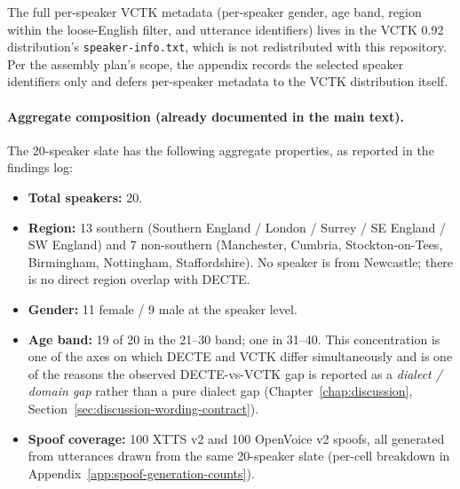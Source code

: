 The full per-speaker VCTK metadata (per-speaker gender, age band,
region within the loose-English filter, and utterance identifiers)
lives in the VCTK 0.92 distribution's \texttt{speaker-info.txt}, which
is not redistributed with this repository. Per the assembly plan's
scope, the appendix records the selected speaker identifiers only
and defers per-speaker metadata to the VCTK distribution itself.

\paragraph{Aggregate composition (already documented in the main text).}
The 20-speaker slate has the following aggregate properties, as
reported in the findings log:

\begin{itemize}
    \item \textbf{Total speakers:} 20.
    \item \textbf{Region:} 13 southern (Southern England / London /
        Surrey / SE England / SW England) and 7 non-southern
        (Manchester, Cumbria, Stockton-on-Tees, Birmingham,
        Nottingham, Staffordshire). No speaker is from Newcastle;
        there is no direct region overlap with DECTE.
    \item \textbf{Gender:} 11 female / 9 male at the speaker level.
    \item \textbf{Age band:} 19 of 20 in the 21--30 band; one in
        31--40. This concentration is one of the axes on which
        DECTE and VCTK differ simultaneously and is one of the
        reasons the observed DECTE-vs-VCTK gap is reported as a
        \emph{dialect / domain gap} rather than a pure dialect
        gap (Chapter~\ref{chap:discussion}, Section~\ref{sec:discussion-wording-contract}).
    \item \textbf{Spoof coverage:} 100 XTTS v2 and 100 OpenVoice v2
        spoofs, all generated from utterances drawn from the same
        20-speaker slate (per-cell breakdown in
        Appendix~\ref{app:spoof-generation-counts}).
\end{itemize}
